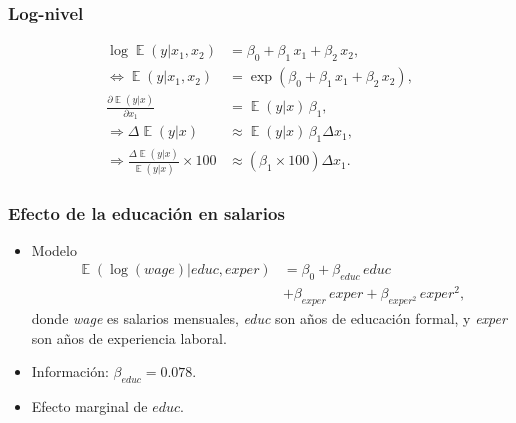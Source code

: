 \documentclass[t, compress, spanish, aspectratio=169]{beamer}
\DeclareMathOperator{\E}{\mathbb{E}}
\begin{document}
    \begin{frame}
        \frametitle{Log-nivel}
            \begin{align*}
             	\log \E(y|x_{1},x_{2})&=\beta_0 + \beta_1 \,x_{1}+\beta_2 \,x_{2},\\
            		\iff \E(y|x_{1},x_{2})&=\exp(\beta_0 + \beta_1 \,x_{1}+\beta_2 \,x_{2}), \\
            		\frac{\partial \E(y|x)}{\partial x_1} & = \E(y|x)\,\beta_1,\\
            		\Rightarrow \Delta \E(y|x) &\approx \E(y|x)\,\beta_1 \Delta x_1 ,\\
            		\Rightarrow \frac{\Delta \E(y|x)}{\E(y|x)} \times 100&\approx (\beta_1\times 100) \Delta x_1.
            \end{align*}
    \end{frame}
    \begin{frame}
        \frametitle{Efecto de la educaci\'on en salarios}
        \begin{itemize}
            \item Modelo
            \begin{align*}
            		\E(\log(wage)|educ, exper)  &= \beta_0 +\beta_{educ} \,educ \\
            		&+\beta_{exper}\, exper + \beta_{exper^2} \,exper^2,
            \end{align*}
            donde \emph{wage} es salarios mensuales, \emph{educ} son a\~nos de educaci\'on formal, y \emph{exper} son a\~nos de experiencia laboral.
            \item Informaci\'on: $\beta_{educ}=0.078$.
            \item Efecto marginal de $educ$.
        \end{itemize}
    \end{frame}
    
    
\end{document}
